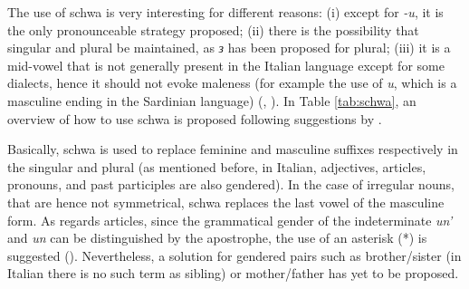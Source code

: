 The use of schwa is very interesting for different reasons: (i) except for \textit{-u}, it is the only pronounceable strategy proposed; (ii) there is the possibility that singular and plural be maintained, as \textit{з} has been proposed for plural; (iii) it is a mid-vowel that is not generally present in the Italian language except for some dialects, hence it should not evoke maleness (for example the use of \textit{u}, which is a masculine ending in the Sardinian language) (\cite{itainclusivoperche}, \cite{gheno2021schwa}). In Table \ref{tab:schwa}, an overview of how to use schwa is proposed following suggestions by \textcite{itainclusivocome}. 

\begin{table}
    \caption[Overview of schwa in Italian]{Overview of schwa in Italian as proposed by \textcite{itainclusivocome}}
    \label{tab:schwa}
\end{table}

Basically, schwa is used to replace feminine and masculine suffixes respectively in the singular and plural (as mentioned before, in Italian, adjectives, articles, pronouns, and past participles are also gendered). In the case of irregular nouns, that are hence not symmetrical, schwa replaces the last vowel of the masculine form. As regards articles, since the grammatical gender of the indeterminate \textit{un'} and \textit{un} can be distinguished by the apostrophe, the use of an asterisk (*) is suggested (\cite{itainclusivocome}). Nevertheless, a solution for gendered pairs such as brother/sister (in Italian there is no such term as sibling) or mother/father has yet to be proposed.

